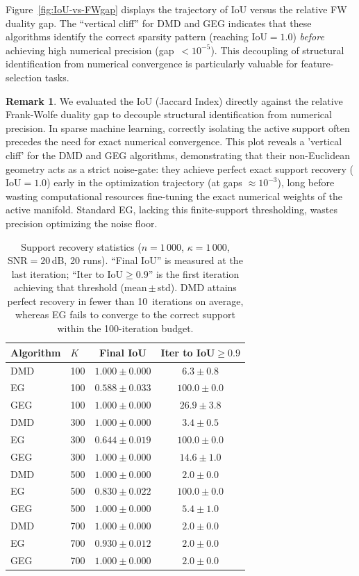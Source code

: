 \documentclass[10pt]{amsart}
\theoremstyle{definition}
\newtheorem{remark}{\textbf{Remark}}
\theoremstyle{definition}	 %
\begin{document}
Figure~\ref{fig:IoU-vs-FWgap} displays the trajectory of IoU versus
the relative FW duality gap.  The ``vertical cliff'' for DMD and GEG
indicates that these algorithms identify the correct sparsity pattern
(reaching $\mathrm{IoU}=1.0$) \emph{before} achieving high numerical
precision (gap~$<10^{-5}$).  This decoupling of structural
identification from numerical convergence is particularly valuable for
feature-selection tasks.

\begin{remark} We evaluated the  IoU (Jaccard Index)  directly against the relative Frank-Wolfe duality gap to decouple structural identification from numerical precision. In sparse machine learning, correctly isolating the active support often precedes the need for exact numerical convergence. This plot reveals a 'vertical cliff' for the DMD and GEG  algorithms, demonstrating that their non-Euclidean geometry acts as a strict noise-gate: they achieve perfect exact support recovery ($\text{IoU} = 1.0$) early in the optimization trajectory (at gaps $\approx 10^{-3}$), long before wasting computational resources fine-tuning the exact numerical weights of the active manifold. Standard EG, lacking this finite-support thresholding, wastes precision optimizing the noise floor.
\end{remark}

\begin{table}[t]
  \centering
  \caption{Support recovery statistics ($n=1\,000$,
  $\kappa=1\,000$, $\mathrm{SNR}=20$\,dB, 20 runs).  ``Final IoU''
  is measured at the last iteration; ``Iter to IoU$\ge 0.9$'' is the
  first iteration achieving that threshold (mean\,$\pm$\,std).  DMD
  attains perfect recovery in fewer than 10~iterations on average,
  whereas EG fails to converge to the correct support within the
  100-iteration budget.}
  \label{tab:support}
  \begin{tabular}{llcc}
    \toprule
    Algorithm & $K$ & Final IoU & Iter to IoU$\ge 0.9$\\
    \midrule
    DMD & 100 & $1.000\pm 0.000$ & $6.3\pm 0.8$\\
    EG  & 100 & $0.588\pm 0.033$ & $100.0\pm 0.0$\\
    GEG & 100 & $1.000\pm 0.000$ & $26.9\pm 3.8$\\
    \midrule
    DMD & 300 & $1.000\pm 0.000$ & $3.4\pm 0.5$\\
    EG  & 300 & $0.644\pm 0.019$ & $100.0\pm 0.0$\\
    GEG & 300 & $1.000\pm 0.000$ & $14.6\pm 1.0$\\
    \midrule
    DMD & 500 & $1.000\pm 0.000$ & $2.0\pm 0.0$\\
    EG  & 500 & $0.830\pm 0.022$ & $100.0\pm 0.0$\\
    GEG & 500 & $1.000\pm 0.000$ & $5.4\pm 1.0$\\
    \midrule
    DMD & 700 & $1.000\pm 0.000$ & $2.0\pm 0.0$\\
    EG  & 700 & $0.930\pm 0.012$ & $2.0\pm 0.0$\\
    GEG & 700 & $1.000\pm 0.000$ & $2.0\pm 0.0$\\
    \bottomrule
  \end{tabular}
\end{table}
\end{document}
